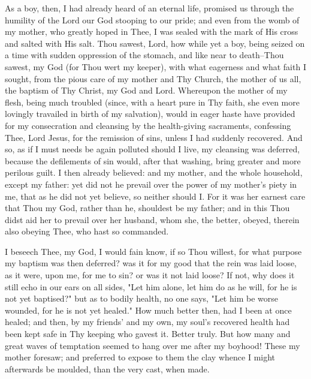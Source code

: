 \documentclass[b5paper,openright,12pt,twoside]{book}
\begin{document}
  As a boy, then, I had already heard of an eternal life, promised
us through the humility of the Lord our God stooping to our pride; and
even from the womb of my mother, who greatly hoped in Thee, I was sealed
with the mark of His cross and salted with His salt. Thou sawest, Lord,
how while yet a boy, being seized on a time with sudden oppression of
the stomach, and like near to death--Thou sawest, my God (for Thou wert
my keeper), with what eagerness and what faith I sought, from the pious
care of my mother and Thy Church, the mother of us all, the baptism of
Thy Christ, my God and Lord. Whereupon the mother of my flesh, being
much troubled (since, with a heart pure in Thy faith, she even more
lovingly travailed in birth of my salvation), would in eager haste
have provided for my consecration and cleansing by the health-giving
sacraments, confessing Thee, Lord Jesus, for the remission of sins,
unless I had suddenly recovered. And so, as if I must needs be
again polluted should I live, my cleansing was deferred, because the
defilements of sin would, after that washing, bring greater and more
perilous guilt. I then already believed: and my mother, and the whole
household, except my father: yet did not he prevail over the power of my
mother's piety in me, that as he did not yet believe, so neither
should I. For it was her earnest care that Thou my God, rather than he,
shouldest be my father; and in this Thou didst aid her to prevail over
her husband, whom she, the better, obeyed, therein also obeying Thee,
who hast so commanded.

  I beseech Thee, my God, I would fain know, if so Thou willest, for
what purpose my baptism was then deferred? was it for my good that the
rein was laid loose, as it were, upon me, for me to sin? or was it not
laid loose? If not, why does it still echo in our ears on all sides,
"Let him alone, let him do as he will, for he is not yet baptised?" but
as to bodily health, no one says, "Let him be worse wounded, for he is
not yet healed." How much better then, had I been at once healed; and
then, by my friends' and my own, my soul's recovered health had been
kept safe in Thy keeping who gavest it. Better truly. But how many and
great waves of temptation seemed to hang over me after my boyhood! These
my mother foresaw; and preferred to expose to them the clay whence I
might afterwards be moulded, than the very cast, when made.
\end{document}
